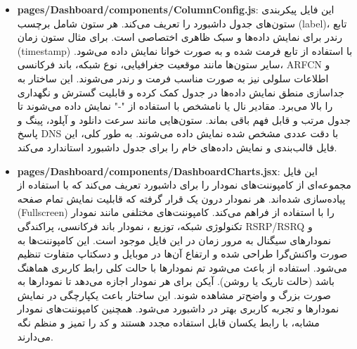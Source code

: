 \begin{itemize}
    	\item \textbf{pages/Dashboard/components/ColumnConfig.js}:  
    	این فایل پیکربندی ستون‌های جدول داشبورد را تعریف می‌کند.  
    	هر ستون شامل برچسب (label)، تابع رندر برای نمایش داده‌ها و سبک ظاهری اختصاصی است.  
    	برای مثال ستون زمان (timestamp) با استفاده از تابع  فرمت شده و به صورت خوانا نمایش داده می‌شود.  
    	سایر ستون‌ها مانند موقعیت جغرافیایی، نوع شبکه، باند فرکانسی، ARFCN و اطلاعات سلولی نیز به صورت مناسب فرمت و رندر می‌شوند.  
    	این ساختار به جداسازی منطق نمایش داده‌ها در جدول کمک کرده و قابلیت گسترش و نگهداری را بالا می‌برد.  
    	مقادیر نال یا نامشخص با استفاده از "-" نمایش داده می‌شوند تا جدول مرتب و قابل فهم باقی بماند.  
    	ستون‌هایی مانند سرعت دانلود و آپلود، پینگ و پاسخ DNS با دقت عددی مشخص شده نمایش داده می‌شوند.  
    	به طور کلی، این فایل قالب‌بندی و نمایش داده‌های خام را برای جدول داشبورد استاندارد می‌کند.  
    	
    	\item \textbf{pages/Dashboard/components/DashboardCharts.jsx}:  
    	این فایل مجموعه‌ای از کامپوننت‌های نمودار را برای داشبورد تعریف می‌کند که با استفاده از  پیاده‌سازی شده‌اند.  
    	هر نمودار درون یک  قرار گرفته که قابلیت نمایش تمام صفحه (Fullscreen) را با استفاده از  فراهم می‌کند.  
    	کامپوننت‌های مختلفی مانند نمودار تکنولوژی شبکه، توزیع ، نمودار باند فرکانسی، پراکندگی RSRP/RSRQ و نمودارهای سیگنال به مرور زمان در این فایل موجود است.  
    	این کامپوننت‌ها به صورت واکنش‌گرا طراحی شده و ارتفاع آن‌ها در موبایل و دسکتاپ متفاوت تنظیم می‌شود.  
    	استفاده از  باعث می‌شود تم نمودارها با حالت کلی رابط کاربری هماهنگ باشد (حالت تاریک یا روشن).  
    	آیکن  برای هر نمودار اجازه می‌دهد تا نمودارها به صورت بزرگ و واضح‌تر مشاهده شوند.  
    	این ساختار باعث یکپارچگی در نمایش نمودارها و تجربه کاربری بهتر در داشبورد می‌شود.  
    	همچنین کامپوننت‌های نمودار مشابه، با رابط یکسان قابل استفاده مجدد هستند و کد را تمیز و منظم نگه می‌دارند.
    	

\end{itemize}
